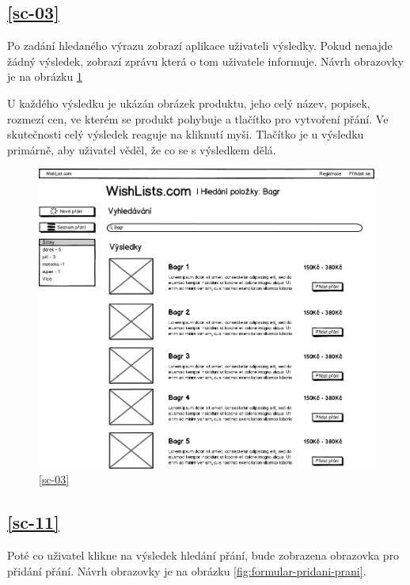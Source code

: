 \subsection{\ref{sc-03}}
Po zadání hledaného výrazu zobrazí aplikace uživateli výsledky. Pokud nenajde žádný výsledek, zobrazí zprávu která o tom uživatele informuje. Návrh obrazovky je na obrázku \ref{fig:vysledky-hledani}

U každého výsledku je ukázán obrázek produktu, jeho celý název, popisek, rozmezí cen, ve kterém se produkt pohybuje a tlačítko pro vytvoření přání. Ve skutečnosti celý výsledek reaguje na kliknutí myši. Tlačítko je u výsledku primárně, aby uživatel věděl, že co se s výsledkem dělá.

\begin{figure}[htb]
\begin{center}
\includegraphics[width=130mm]{./pictures/mock/vysledky-hledani.png}
\caption{\ref{sc-03}}
\label{fig:vysledky-hledani}
\end{center}
\end{figure}

\subsection{\ref{sc-11}}
\label{sec:wireframe-pridani-prani}
Poté co uživatel klikne na výsledek hledání přání, bude zobrazena obrazovka pro přidání přání.  Návrh obrazovky je na obrázku \ref{fig:formular-pridani-prani}.

